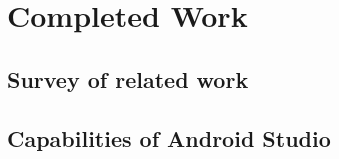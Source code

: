 \section{Completed Work}
\subsection{Survey of related work}
\subsection{Capabilities of Android Studio}